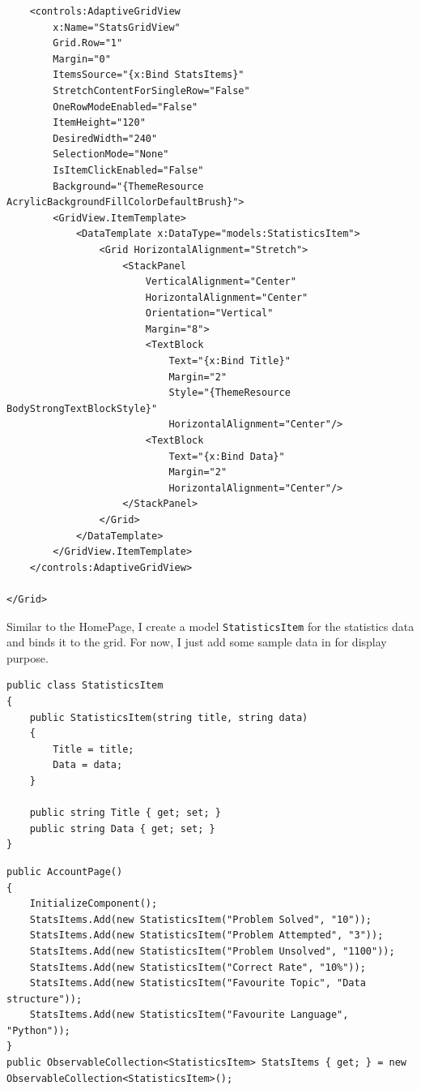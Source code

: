 \documentclass[a4paper]{report}
\newcommand{\code}{\texttt}
\begin{document}
\begin{verbatim}
    <controls:AdaptiveGridView
        x:Name="StatsGridView"
        Grid.Row="1"
        Margin="0"
        ItemsSource="{x:Bind StatsItems}"
        StretchContentForSingleRow="False"
        OneRowModeEnabled="False"
        ItemHeight="120"
        DesiredWidth="240"
        SelectionMode="None"
        IsItemClickEnabled="False"
        Background="{ThemeResource AcrylicBackgroundFillColorDefaultBrush}">
        <GridView.ItemTemplate>
            <DataTemplate x:DataType="models:StatisticsItem">
                <Grid HorizontalAlignment="Stretch">
                    <StackPanel 
                        VerticalAlignment="Center"
                        HorizontalAlignment="Center"
                        Orientation="Vertical"
                        Margin="8">
                        <TextBlock
                            Text="{x:Bind Title}"
                            Margin="2"
                            Style="{ThemeResource BodyStrongTextBlockStyle}"
                            HorizontalAlignment="Center"/>
                        <TextBlock 
                            Text="{x:Bind Data}"
                            Margin="2"
                            HorizontalAlignment="Center"/>
                    </StackPanel>
                </Grid>
            </DataTemplate>
        </GridView.ItemTemplate>
    </controls:AdaptiveGridView>

</Grid>
\end{verbatim}

Similar to the HomePage, I create a model \code{StatisticsItem} for the statistics data and binds it to the grid. For now, I just add some sample data in for display purpose.

\begin{verbatim}
public class StatisticsItem
{
    public StatisticsItem(string title, string data)
    {
        Title = title;
        Data = data;
    }

    public string Title { get; set; }
    public string Data { get; set; }
}
\end{verbatim}

\begin{verbatim}
public AccountPage()
{
    InitializeComponent();
    StatsItems.Add(new StatisticsItem("Problem Solved", "10"));
    StatsItems.Add(new StatisticsItem("Problem Attempted", "3"));
    StatsItems.Add(new StatisticsItem("Problem Unsolved", "1100"));
    StatsItems.Add(new StatisticsItem("Correct Rate", "10%"));
    StatsItems.Add(new StatisticsItem("Favourite Topic", "Data structure"));
    StatsItems.Add(new StatisticsItem("Favourite Language", "Python"));
}
public ObservableCollection<StatisticsItem> StatsItems { get; } = new ObservableCollection<StatisticsItem>();
\end{verbatim}
\end{document}
